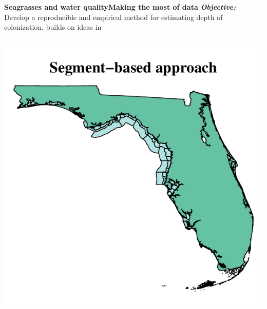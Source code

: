 \documentclass[serif]{beamer}\usepackage[]{graphicx}\usepackage[]{color}
\makeatletter
\def\maxwidth{ %
  \ifdim\Gin@nat@width>\linewidth
    \linewidth
  \else
    \Gin@nat@width
  \fi
}
\newenvironment{knitrout}{}{} %
\newcommand{\emtxt}[1]{\textbf{\textit{#1}}}
\makeatother
\begin{document}
\begin{frame}{\textbf{Seagrasses and water quality}}{\textbf{Making the most of data}}
\onslide<+->
\emtxt{Objective:} Develop a reproducible and empirical method for estimating depth of colonization, builds on ideas in \cite{HagyIR}
\begin{columns}[T]
\begin{column}{0.5\textwidth}
\begin{knitrout}
\color{fgcolor}

{\centering \includegraphics[width=\maxwidth]{fig//segmap} 

}




\end{knitrout}
\end{column}
\end{columns}
\end{frame}
\end{document}
